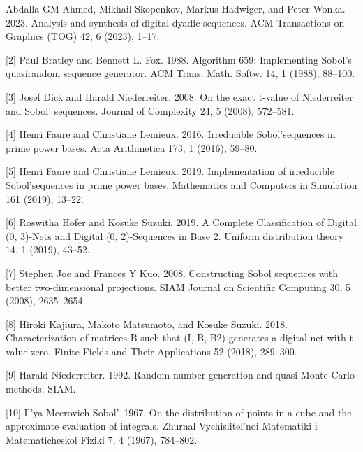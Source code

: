 \begin{talk}
[1] Abdalla GM Ahmed, Mikhail Skopenkov, Markus Hadwiger, and Peter Wonka. 2023. Analysis and synthesis of digital dyadic sequences. ACM Transactions on Graphics (TOG) 42, 6 (2023), 1–17.

[2] Paul Bratley and Bennett L. Fox. 1988. Algorithm 659: Implementing Sobol’s quasirandom sequence generator. ACM Trans. Math. Softw. 14, 1 (1988), 88–100.

[3] Josef Dick and Harald Niederreiter. 2008. On the exact t-value of Niederreiter and Sobol’ sequences. Journal of Complexity 24, 5 (2008), 572–581.

[4] Henri Faure and Christiane Lemieux. 2016. Irreducible Sobol’sequences in prime power bases. Acta Arithmetica 173, 1 (2016), 59–80.

[5] Henri Faure and Christiane Lemieux. 2019. Implementation of irreducible Sobol’sequences in prime power bases. Mathematics and Computers in Simulation 161 (2019), 13–22.

[6] Roswitha Hofer and Kosuke Suzuki. 2019. A Complete Classification of Digital (0, 3)-Nets and Digital (0, 2)-Sequences in Base 2. Uniform distribution theory 14, 1 (2019), 43–52.

[7] Stephen Joe and Frances Y Kuo. 2008. Constructing Sobol sequences with better two-dimensional projections. SIAM Journal on Scientific Computing 30, 5 (2008), 2635–2654.

[8] Hiroki Kajiura, Makoto Matsumoto, and Kosuke Suzuki. 2018. Characterization of matrices B such that (I, B, B2) generates a digital net with t-value zero. Finite Fields and Their
Applications 52 (2018), 289–300.

[9] Harald Niederreiter. 1992. Random number generation and quasi-Monte Carlo methods. SIAM.

[10] Il’ya Meerovich Sobol’. 1967. On the distribution of points in a cube and the approximate evaluation of integrals. Zhurnal Vychislitel’noi Matematiki i Matematicheskoi Fiziki 7, 4 (1967), 784–802.
\end{talk}


